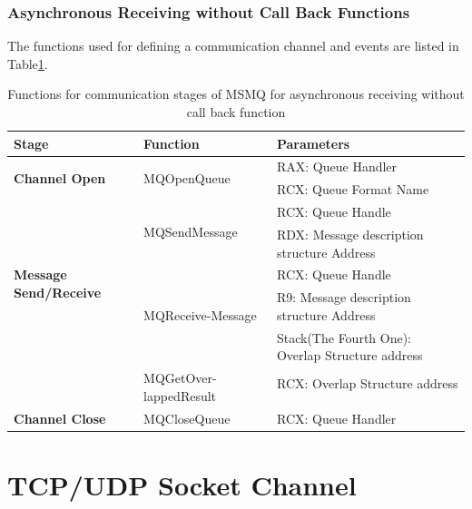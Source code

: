 \subsubsection{Asynchronous Receiving without Call Back Functions}
The functions used for defining a communication channel and events are listed in Table\ref{msmqasynfunctions}.
    \begin{table}[h]
        \centering
        \caption{Functions for communication stages of MSMQ for asynchronous receiving without call back function}
        \label{msmqasynfunctions}
        \begin{tabular}{|l|l|l|}
            \hline
             \textbf{Stage} & \textbf{Function}& \textbf{Parameters}  \\
             \hline
             \multirow{2}{*}{{\textbf{Channel Open}}}
             &\multirow{2}{*}{{MQOpenQueue}} &  RAX: Queue Handler\\
              \cline{3-3} 
             & &  RCX: Queue Format Name\\
            \hline
             \multirow{5}{*}{\parbox{2.5cm}{\textbf{Message Send/Receive}}}
             &\multirow{2}{*}{MQSendMessage} &  RCX: Queue Handle \\
              \cline{3-3} 
             &&  RDX: Message description structure Address \\
            \cline{2-3}
             & \multirow{3}{*}{\parbox{2.5cm}{MQReceive-Message}}&  RCX: Queue Handle \\
              \cline{3-3} 
              &&  R9: Message description structure Address \\
                            \cline{3-3} 
              &&  Stack(The Fourth One): Overlap Structure address\\
                          \cline{2-3}
                          
              & \multirow{2}{*}{\parbox{2.5cm}{MQGetOver-lappedResult}} &  RCX: Overlap Structure address  \\
              &&\\
            \hline
            \textbf{Channel Close} &MQCloseQueue & RCX: Queue Handler \\
            \hline
        \end{tabular}
    \end{table}
\section{TCP/UDP Socket Channel}



